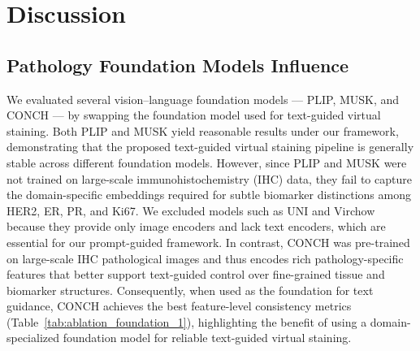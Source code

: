 \documentclass[journal,twoside,web]{ieeecolor}
\begin{document}




\section{Discussion}



\subsection{Pathology Foundation Models Influence}
{We evaluated several vision–language foundation models — PLIP, MUSK, and CONCH — by swapping the foundation model used for text-guided virtual staining. Both PLIP and MUSK yield reasonable results under our framework, demonstrating that the proposed text-guided virtual staining pipeline is generally stable across different foundation models. However, since PLIP and MUSK were not trained on large-scale immunohistochemistry (IHC) data, they fail to capture the domain-specific embeddings required for subtle biomarker distinctions among HER2, ER, PR, and Ki67. We excluded models such as UNI and Virchow because they provide only image encoders and lack text encoders, which are essential for our prompt-guided framework. In contrast, CONCH was pre-trained on large-scale IHC pathological images and thus encodes rich pathology-specific features that better support text-guided control over fine-grained tissue and biomarker structures. Consequently, when used as the foundation for text guidance, CONCH achieves the best feature-level consistency metrics (Table~\ref{tab:ablation_foundation_1}), highlighting the benefit of using a domain-specialized foundation model for reliable text-guided virtual staining.}
\end{document}

